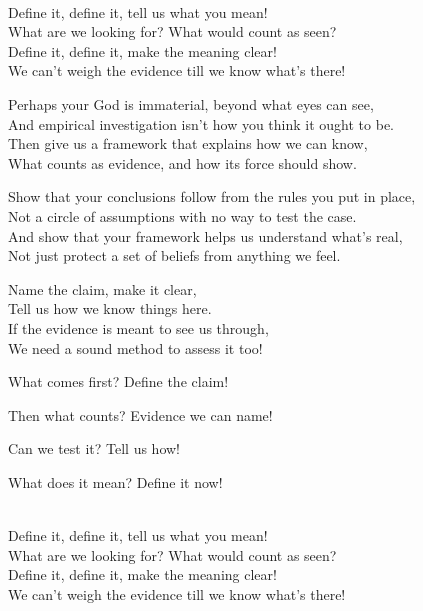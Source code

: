 \begin{lyrics}
\\
Define it, define it, tell us what you mean!\\
What are we looking for? What would count as seen?\\
Define it, define it, make the meaning clear!\\
We can't weigh the evidence till we know what's there!


Perhaps your God is immaterial, beyond what eyes can see,\\
And empirical investigation isn't how you think it ought to be.\\
Then give us a framework that explains how we can know,\\
What counts as evidence, and how its force should show.

Show that your conclusions follow from the rules you put in place,\\
Not a circle of assumptions with no way to test the case.\\
And show that your framework helps us understand what's real,\\
Not just protect a set of beliefs from anything we feel.


Name the claim, make it clear,\\
Tell us how we know things here.\\
If the evidence is meant to see us through,\\
We need a sound method to assess it too!


 What comes first?
 Define the claim!

 Then what counts?
 Evidence we can name!

 Can we test it?
 Tell us how!

 What does it mean?
 Define it now!

\\
Define it, define it, tell us what you mean!\\
What are we looking for? What would count as seen?\\
Define it, define it, make the meaning clear!\\
We can't weigh the evidence till we know what's there!


\end{lyrics}
